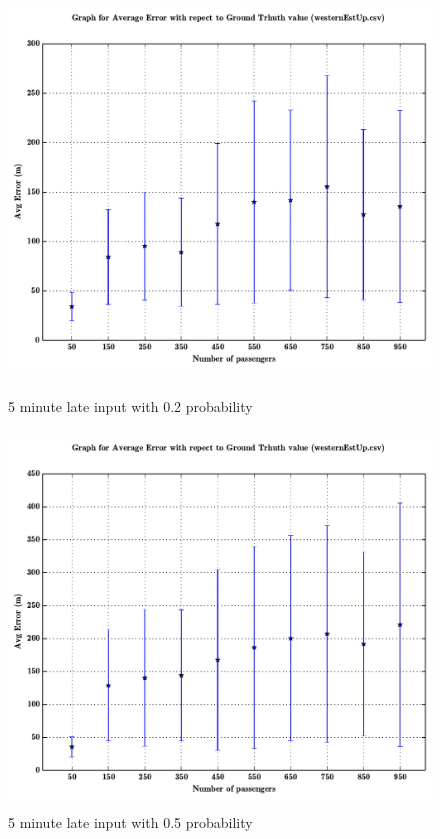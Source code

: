\documentclass[a4paper,12pt]{report}
\begin{document}
\begin{figure}[h!]

\centering
\includegraphics[height=10cm,width=17cm]{02_5minlate.pdf}
\caption{5 minute late input with 0.2 probability}

\centering
\includegraphics[height=10cm,width=17cm]{03_5minlate.pdf}
\caption{5 minute late input with 0.5 probability}
\end{figure}
\end{document}
